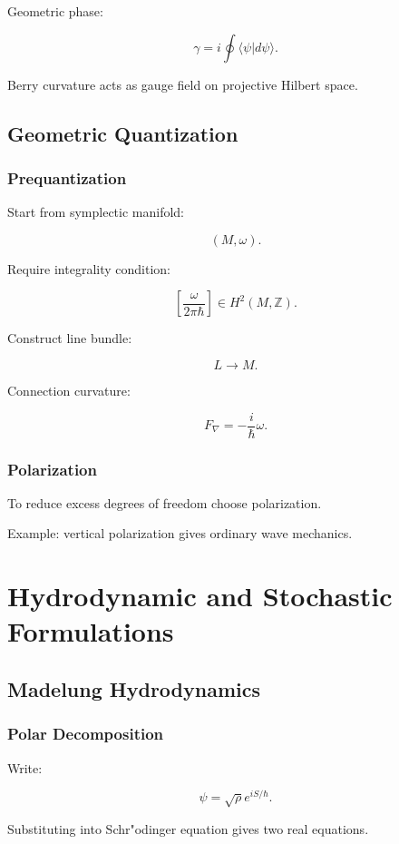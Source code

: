 \documentclass[11pt]{book}
\begin{document}
Geometric phase:

\[
\gamma
=
i\oint
\langle \psi|d\psi\rangle.
\]

Berry curvature acts as gauge field on projective Hilbert space.

\chapter{Geometric Quantization}

\section{Prequantization}

Start from symplectic manifold:

\[
(M,\omega).
\]

Require integrality condition:

\[
\left[\frac{\omega}{2\pi\hbar}\right]
\in H^2(M,\mathbb Z).
\]

Construct line bundle:

\[
L\to M.
\]

Connection curvature:

\[
F_\nabla
=
-\frac{i}{\hbar}\omega.
\]

\section{Polarization}

To reduce excess degrees of freedom choose polarization.

Example: vertical polarization gives ordinary wave mechanics.

\part{Hydrodynamic and Stochastic Formulations}

\chapter{Madelung Hydrodynamics}

\section{Polar Decomposition}

Write:

\[
\psi
=
\sqrt\rho e^{iS/\hbar}.
\]

Substituting into Schr"odinger equation gives two real equations.
\end{document}
